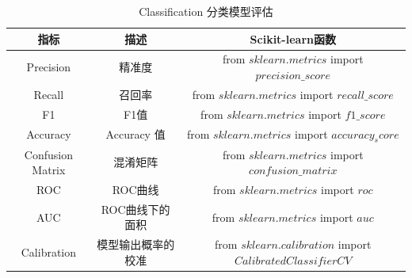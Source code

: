 \documentclass[12pt]{article}
\numberwithin{theorem}{section} %
\numberwithin{definition}{section} %
\numberwithin{assumption}{section} %
\numberwithin{lemma}{section} %
\numberwithin{remark}{section} %
\numberwithin{prop}{section} %
\numberwithin{corollary}{section} %
\numberwithin{example}{section} %
\numberwithin{question}{section} %
\numberwithin{problem}{section} %
\numberwithin{conjecture}{section} %
\numberwithin{append}{section} %
\numberwithin{property}{section} %
\newcommand{\ra}[1]{\renewcommand{\arraystretch}{#1}}
\begin{document}
\begin{CJK}{UTF8}{gbsn}
	
	\begin{table}[h]\centering
		\caption{Classification 分类模型评估}
		\label{Classification Evaluation}
		\ra{1.1}
		\begin{tabular}{@{}ccc@{}}
			\toprule
			指标&  描述 & Scikit-learn函数 \\
			\midrule
			Precision&  精准度 & from $sklearn.metrics$ import $precision\_score$\\
			Recall&  召回率 & from $sklearn.metrics$ import $recall\_score$\\
			F1&  F1值 & from $sklearn.metrics$ import $f1\_score$\\
			Accuracy &  Accuracy 值 & from $sklearn.metrics$ import $accuracy_score$\\
			Confusion Matrix&  混淆矩阵 & from $sklearn.metrics$ import $confusion\_matrix$\\
			ROC&  ROC曲线 & from $sklearn.metrics$ import $roc$\\
			AUC&  ROC曲线下的面积 & from $sklearn.metrics$ import $auc$\\
			Calibration&  模型输出概率的校准 & from $sklearn.calibration$ import $CalibratedClassifierCV$\\
			\bottomrule
		\end{tabular}
	\end{table}


\end{CJK}
\end{document}

